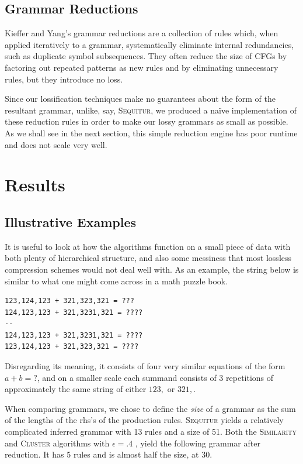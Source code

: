\documentclass[11pt]{article}
\newcommand{\Sequitur}{\textsc{Sequitur}\xspace}
\newcommand{\Similarity}{\textsc{Similarity}\xspace}
\newcommand{\Cluster}{\textsc{Cluster}\xspace}
\begin{document}
\subsection{Grammar Reductions}

Kieffer and Yang's grammar reductions are a collection of rules which, when
applied iteratively to a grammar, systematically eliminate internal
redundancies, such as duplicate symbol subsequences.  They often reduce the
size of CFGs by factoring out repeated patterns as new rules and by eliminating
unnecessary rules, but they introduce no loss.

Since our lossification techniques make no guarantees about the form of the
resultant grammar, unlike, say, \Sequitur, we produced a na\"ive implementation
of these reduction rules in order to make our lossy grammars as small as
possible.  As we shall see in the next section, this simple reduction engine
has poor runtime and does not scale very well.

\section{Results}

\subsection{Illustrative Examples}

It is useful to look at how the algorithms function on a small piece of data
with both plenty of hierarchical structure, and also some messiness that most
lossless compression schemes would not deal well with. As an example, the
string below is similar to what one might come across in a math puzzle book.

\begin{verbatim}
123,124,123 + 321,323,321 = ???
124,123,123 + 321,3231,321 = ????
--
124,123,123 + 321,3231,321 = ????
123,124,123 + 321,323,321 = ????
\end{verbatim}

Disregarding its meaning, it consists of four very similar equations of the
form $a + b = ?$, and on a smaller scale each summand consists of 3 repetitions
of approximately the same string of either $123,$ or $321,$.

When comparing grammars, we chose to define the \emph{size} of a grammar as the
sum of the lengths of the rhs's of the production rules.  \Sequitur yields a
relatively complicated inferred grammar with 13 rules and a size of 51. Both
the \Similarity and \Cluster algorithms with $\epsilon = .4$ , yield the
following grammar after reduction. It has 5 rules and is almost half the size,
at 30.
\end{document}
